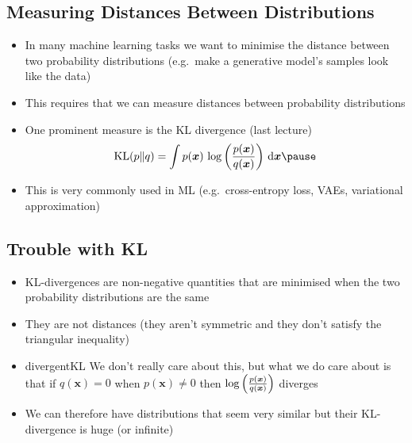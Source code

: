 \begin{slide}
\section{Measuring Distances Between Distributions}

\begin{PauseHighLight}
  \begin{itemize}
  \item In many machine learning tasks we want to minimise the
    distance between two probability distributions (e.g.\ make a
    generative model's samples look like the data)\pause
  \item This requires that we can measure distances between
    probability distributions\pause
  \item One prominent measure is the KL divergence (last lecture)
    \begin{align*}
      \mathrm{KL}(p\|q) = \int p(\bm{x}) \,
      \logg{\frac{p(\bm{x})}{q(\bm{x})}} \, \dd \bm{x}\pause
    \end{align*}
  \item This is very commonly used in ML (e.g.\ cross-entropy loss,
    VAEs, variational approximation)\pause
  \end{itemize}
\end{PauseHighLight}

\end{slide}


\begin{slide}
\section[-2]{Trouble with KL}

\begin{PauseHighLight}
  \begin{itemize}
  \item KL-divergences are non-negative quantities that are minimised
    when the two probability distributions are the same\pause
  \item They are not distances (they aren't symmetric and they don't
    satisfy the triangular inequality)\pause
  \item
    \begin{rightImage}{divergentKL}
      We don't really care about this, but what we do care about is
    that if $q(\bm{x})=0$ when $p(\bm{x})\neq 0$ then
    $\log\left( \frac{p(\bm{x})}{q(\bm{x})} \right)$ diverges\pause
    \end{rightImage}
  \item We can therefore have distributions that seem very similar but
    their KL-divergence is huge (or infinite)\pause
  \end{itemize}
\end{PauseHighLight}

\end{slide}

